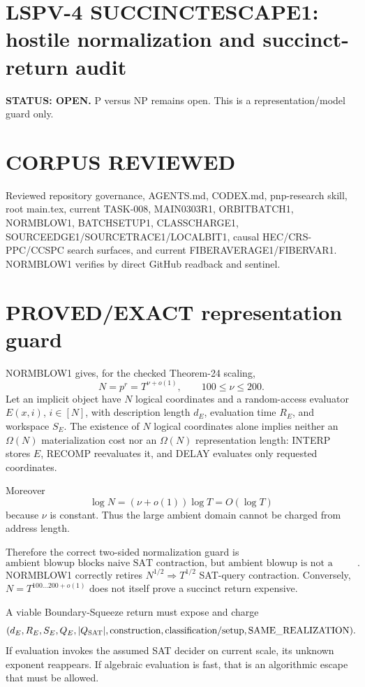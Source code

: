 \documentclass[11pt]{article}
\begin{document}
\section*{LSPV-4 SUCCINCTESCAPE1: hostile normalization and succinct-return audit}
\textbf{STATUS: OPEN.} P versus NP remains open. This is a representation/model guard only.

\section*{CORPUS REVIEWED}
Reviewed repository governance, AGENTS.md, CODEX.md, pnp-research skill, root main.tex, current TASK-008, MAIN0303R1, ORBITBATCH1, NORMBLOW1, BATCHSETUP1, CLASSCHARGE1, SOURCEEDGE1/SOURCETRACE1/LOCALBIT1, causal HEC/CRS-PPC/CCSPC search surfaces, and current FIBERAVERAGE1/FIBERVAR1. NORMBLOW1 verifies by direct GitHub readback and sentinel.

\section*{PROVED/EXACT representation guard}
NORMBLOW1 gives, for the checked Theorem-24 scaling,
\[
N=p^r=T^{\nu+o(1)},\qquad100\le\nu\le200.
\]
Let an implicit object have \(N\) logical coordinates and a random-access evaluator \(E(x,i)\), \(i\in[N]\), with description length \(d_E\), evaluation time \(R_E\), and workspace \(S_E\). The existence of \(N\) logical coordinates alone implies neither an \(\Omega(N)\) materialization cost nor an \(\Omega(N)\) representation length: INTERP stores \(E\), RECOMP reevaluates it, and DELAY evaluates only requested coordinates.

Moreover
\[
\log N=(\nu+o(1))\log T=O(\log T)
\]
because \(\nu\) is constant. Thus the large ambient domain cannot be charged from address length.

Therefore the correct two-sided normalization guard is
\[
\boxed{\text{ambient blowup blocks naive SAT contraction, but ambient blowup is not a lower bound}.}
\]
NORMBLOW1 correctly retires \(N^{1/2}\Rightarrow T^{1/2}\) SAT-query contraction. Conversely, \(N=T^{100\ldots200+o(1)}\) does not itself prove a succinct return expensive.

A viable Boundary-Squeeze return must expose and charge
\[
(d_E,R_E,S_E,Q_E,|Q_{\rm SAT}|,\text{construction},\text{classification/setup},\text{SAME\_REALIZATION}).
\]
If evaluation invokes the assumed SAT decider on current scale, its unknown exponent reappears. If algebraic evaluation is fast, that is an algorithmic escape that must be allowed.
\end{document}
